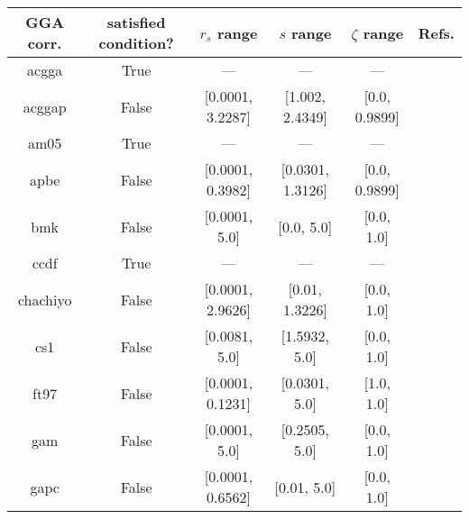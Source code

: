 \begin{tabular}{|c|c|c|c|c|l|}
\hline
     GGA corr. &  satisfied condition? &      $r_s$ range &        $s$ range &   $\zeta$ range  &                                                          Refs. \\ \hline
         acgga &                  True &              --- &              --- &              --- &                        \cite{Cancio2018_084116,Burke2014_4834} \\ \hline
        acggap &                 False & [0.0001, 3.2287] &  [1.002, 2.4349] &    [0.0, 0.9899] &                        \cite{Cancio2018_084116,Burke2014_4834} \\ \hline
          am05 &                  True &              --- &              --- &              --- &                 \cite{Armiento2005_085108,Mattsson2008_084714} \\ \hline
          apbe &                 False & [0.0001, 0.3982] & [0.0301, 1.3126] &    [0.0, 0.9899] &                                   \cite{Constantin2011_186406} \\ \hline
           bmk &                 False &    [0.0001, 5.0] &       [0.0, 5.0] &       [0.0, 1.0] &                                          \cite{Boese2004_3405} \\ \hline
          ccdf &                  True &              --- &              --- &              --- &                                      \cite{Margraf2019_244116} \\ \hline
      chachiyo &                 False & [0.0001, 2.9626] &   [0.01, 1.3226] &       [0.0, 1.0] &                                     \cite{Chachiyo2020_112669} \\ \hline
           cs1 &                 False &    [0.0081, 5.0] &    [1.5932, 5.0] &       [0.0, 1.0] &                          \cite{Handy2002_5411,Proynov2006_436} \\ \hline
          ft97 &                 False & [0.0001, 0.1231] &    [0.0301, 5.0] &       [1.0, 1.0] &                         \cite{Filatov1997_603,Filatov1997_847} \\ \hline
           gam &                 False &    [0.0001, 5.0] &    [0.2505, 5.0] &       [0.0, 1.0] &                                            \cite{Yu2015_12146} \\ \hline
          gapc &                 False & [0.0001, 0.6562] &      [0.01, 5.0] &       [0.0, 1.0] &                                        \cite{Fabiano2014_2016} \\ \hline

\end{tabular}

